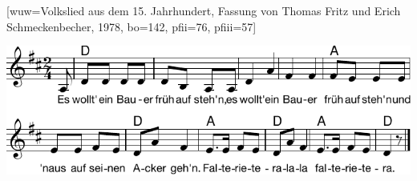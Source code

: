 [wuw={Volkslied aus dem 15. Jahrhundert, Fassung von Thomas Fritz und Erich Schmeckenbecher, 1978}, bo={142}, pfii={76}, pfiii={57}]

\markboth{\songtitle}{\songtitle} 


\beginverse
\endverse

\centering\includegraphics[width=1\textwidth]{Noten/Lied042.pdf}

